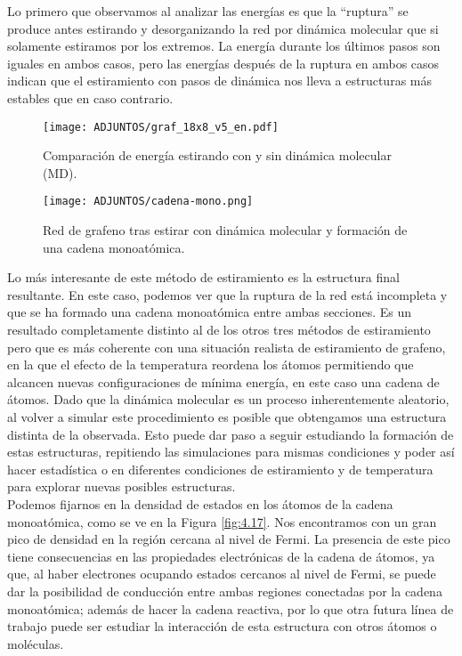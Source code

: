 Lo primero que observamos al analizar las energías es que la ``ruptura'' se produce antes estirando y desorganizando la red por dinámica molecular que si solamente estiramos por los extremos. La energía durante los últimos pasos son iguales en ambos casos, pero las energías después de la ruptura en ambos casos indican que el estiramiento con pasos de dinámica nos lleva a estructuras más estables que en caso contrario. \\

\begin{figure}[!h]
    \centering
    \texttt{[image: ADJUNTOS/graf\_18x8\_v5\_en.pdf]}
    \caption{Comparación de energía estirando con y sin dinámica molecular (MD).}
    \label{fig:4.9}
\end{figure}

\begin{figure}[!h]
    \centering
    \texttt{[image: ADJUNTOS/cadena-mono.png]}
    \caption{Red de grafeno tras estirar con dinámica molecular y formación de una cadena monoatómica.}
    \label{fig:4.10}
\end{figure}

Lo más interesante de este método de estiramiento es la estructura final resultante. En este caso, podemos ver que la ruptura de la red está incompleta y que se ha formado una cadena monoatómica entre ambas secciones. Es un resultado completamente distinto al de los otros tres métodos de estiramiento pero que es más coherente con una situación realista de estiramiento de grafeno, en la que el efecto de la temperatura reordena los átomos permitiendo que alcancen nuevas configuraciones de mínima energía, en este caso una cadena de átomos. Dado que la dinámica molecular es un proceso inherentemente aleatorio, al volver a simular este procedimiento es posible que obtengamos una estructura distinta de la observada. Esto puede dar paso a seguir estudiando la formación de estas estructuras, repitiendo las simulaciones para mismas condiciones y poder así hacer estadística o en diferentes condiciones de estiramiento y de temperatura para explorar nuevas posibles estructuras. \\

Podemos fijarnos en la densidad de estados en los átomos de la cadena monoatómica, como se ve en la Figura \ref{fig:4.17}. Nos encontramos con un gran pico de densidad en la región cercana al nivel de Fermi. La presencia de este pico tiene consecuencias en las propiedades electrónicas de la cadena de átomos, ya que, al haber electrones ocupando estados cercanos al nivel de Fermi, se puede dar la posibilidad de conducción entre ambas regiones conectadas por la cadena monoatómica; además de hacer la cadena reactiva, por lo que otra futura línea de trabajo puede ser estudiar la interacción de esta estructura con otros átomos o moléculas. \\

